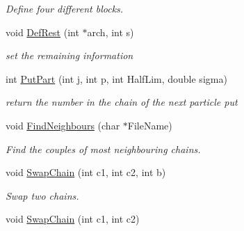 \begin{DoxyCompactItemize}
\begin{DoxyCompactList}\small\item\em \-Define four different blocks. \end{DoxyCompactList}\item 
\hypertarget{classVarData_ac45f6347eaccc5e30273270385d02119}{void \hyperlink{classVarData_ac45f6347eaccc5e30273270385d02119}{\-Def\-Rest} (int $\ast$arch, int s)}\label{classVarData_ac45f6347eaccc5e30273270385d02119}

\begin{DoxyCompactList}\small\item\em set the remaining information \end{DoxyCompactList}\item 
\hypertarget{classVarData_adbad2a97db5e9f837b2ff4e3ae58ec4d}{int \hyperlink{classVarData_adbad2a97db5e9f837b2ff4e3ae58ec4d}{\-Put\-Part} (int j, int p, int \-Half\-Lim, double sigma)}\label{classVarData_adbad2a97db5e9f837b2ff4e3ae58ec4d}

\begin{DoxyCompactList}\small\item\em return the number in the chain of the next particle put \end{DoxyCompactList}\item 
\hypertarget{classVarData_ac99cf9cb839b06e0c3e32ebb8d11d6be}{void \hyperlink{classVarData_ac99cf9cb839b06e0c3e32ebb8d11d6be}{\-Find\-Neighbours} (char $\ast$\-File\-Name)}\label{classVarData_ac99cf9cb839b06e0c3e32ebb8d11d6be}

\begin{DoxyCompactList}\small\item\em \-Find the couples of most neighbouring chains. \end{DoxyCompactList}\item 
\hypertarget{classVarData_a9b8f7a0f3ed7c785a4da59c58781d050}{void \hyperlink{classVarData_a9b8f7a0f3ed7c785a4da59c58781d050}{\-Swap\-Chain} (int c1, int c2, int b)}\label{classVarData_a9b8f7a0f3ed7c785a4da59c58781d050}

\begin{DoxyCompactList}\small\item\em \-Swap two chains. \end{DoxyCompactList}\item 
\hypertarget{classVarData_a99c4147680f33ecf84c4cd007eaf6484}{void \hyperlink{classVarData_a99c4147680f33ecf84c4cd007eaf6484}{\-Swap\-Chain} (int c1, int c2)}\label{classVarData_a99c4147680f33ecf84c4cd007eaf6484}


\end{DoxyCompactItemize}
